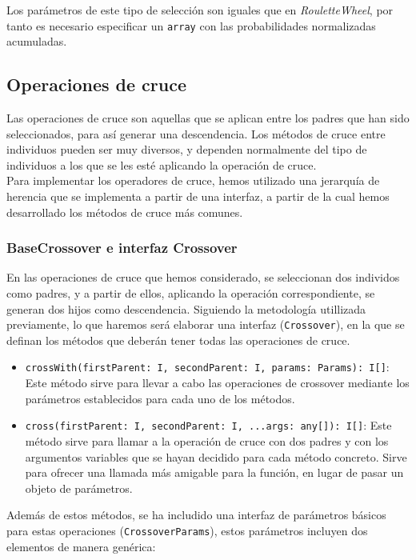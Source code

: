 Los parámetros de este tipo de selección son iguales que en \textit{RouletteWheel}, por tanto es necesario especificar un \texttt{array} con las probabilidades normalizadas acumuladas.

\subsection{Operaciones de cruce}

Las operaciones de cruce son aquellas que se aplican entre los padres que han sido seleccionados, para así generar una descendencia. Los métodos de cruce entre individuos pueden ser muy diversos, y dependen normalmente del tipo de individuos a los que se les esté aplicando la operación de cruce.\\

Para implementar los operadores de cruce, hemos utilizado una jerarquía de herencia que se implementa a partir de una interfaz, a partir de la cual hemos desarrollado los métodos de cruce más comunes.

\subsubsection{BaseCrossover e interfaz Crossover}

En las operaciones de cruce que hemos considerado, se seleccionan dos individos como padres, y a partir de ellos, aplicando la operación correspondiente, se generan dos hijos como descendencia. Siguiendo la metodología utillizada previamente, lo que haremos será elaborar una interfaz (\texttt{Crossover}), en la que se definan los métodos que deberán tener todas las operaciones de cruce.

\begin{itemize}
    \item \texttt{crossWith(firstParent: I, secondParent: I, params: Params): I[]}: Este método sirve para llevar a cabo las operaciones de crossover mediante los parámetros establecidos para cada uno de los métodos.
    \item \texttt{cross(firstParent: I, secondParent: I, ...args: any[]): I[]}: Este método sirve para llamar a la operación de cruce con dos padres y con los argumentos variables que se hayan decidido para cada método concreto. Sirve para ofrecer una llamada más amigable para la función, en lugar de pasar un objeto de parámetros.
\end{itemize}

Además de estos métodos, se ha includido una interfaz de parámetros básicos para estas operaciones (\texttt{CrossoverParams}), estos parámetros incluyen dos elementos de manera genérica:

